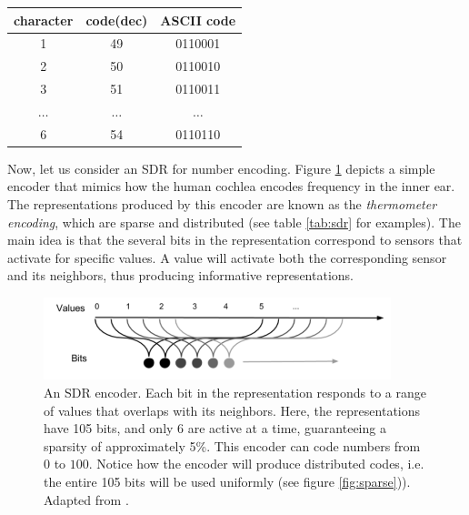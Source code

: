 \documentclass[runningheads]{llncs}
\begin{document}
\begin{center}
 \label{tab:ascci}
 \begin{tabular}{||c c c ||} 
 \hline
 character & code(dec) & ASCII code \\ [0.5ex] 
 \hline\hline
 1 & 49 & 0110001 \\
 \hline
 2 & 50 & 0110010 \\
 \hline
 3 & 51 & 0110011 \\
 \hline
 $\dots$ &  $\dots$ &  $\dots$\\ 
 \hline
 6 & 54 & 0110110 \\ [1ex]
 \hline
\end{tabular}
\end{center}

Now, let us consider an SDR for number encoding. Figure \ref{fig:SDR_number_encoder} depicts a simple encoder that mimics how the human cochlea encodes frequency in the inner ear. The representations produced by this encoder are known as the \textit{thermometer encoding},  which are sparse and distributed (see table \ref{tab:sdr} for examples). The main idea is that the several bits in the representation correspond to sensors that activate for specific values. A value will activate both the corresponding sensor and its neighbors, thus producing informative representations. 

\begin{figure}[h]
    \centering
    \includegraphics[width=0.9\textwidth]{img/SDR_number_encoder.PNG}
    \caption{An SDR encoder. Each bit in the representation responds to a range of values that overlaps with its neighbors. Here, the representations have 105 bits, and only 6 are active at a time, guaranteeing a sparsity of approximately 5\%. This encoder can code numbers from $0$ to $100$. Notice how the encoder will produce distributed codes, i.e. the entire 105 bits will be used uniformly (see figure \ref{fig:sparse})). Adapted from \cite{Hawkins-et-al-2016-Book}.}
\label{fig:SDR_number_encoder}
\end{figure}
\end{document}
